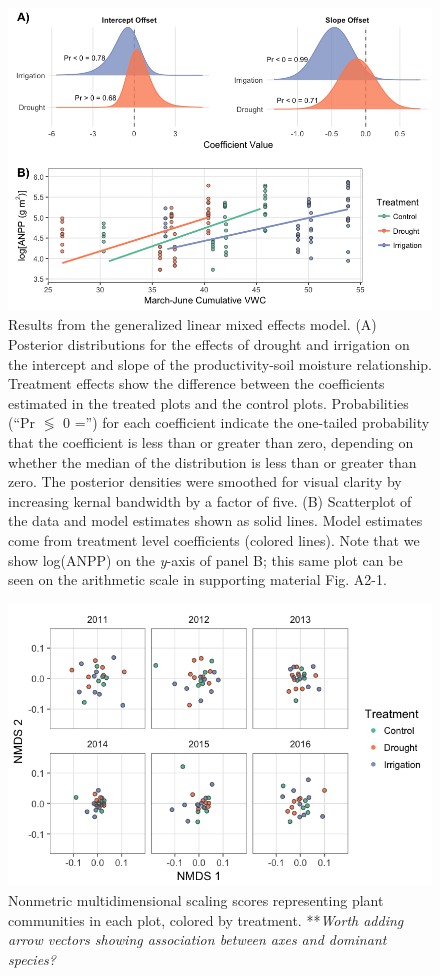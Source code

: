 \documentclass[fleqn,10pt,lineno]{wlpeerj} %
\begin{document}
\begin{figure}[!ht]
  \centering
      \includegraphics[width=5in]{../figures/glmm_main_results.png}
  \caption{Results from the generalized linear mixed effects model. (A) Posterior distributions for the effects of drought and irrigation on the intercept and slope of the productivity-soil moisture relationship. Treatment effects show the difference between the coefficients estimated in the treated plots and the control plots. Probabilities (``Pr $\lessgtr$ 0 ='') for each coefficient indicate the one-tailed probability that the coefficient is less than or greater than zero, depending on whether the median of the distribution is less than or greater than zero. The posterior densities were smoothed for visual clarity by increasing kernal bandwidth by a factor of five. (B) Scatterplot of the data and model estimates shown as solid lines. Model estimates come from treatment level coefficients (colored lines). Note that we show log(ANPP) on the \emph{y}-axis of panel B; this same plot can be seen on the arithmetic scale in supporting material Fig. A2-1.}
\end{figure}

\newpage{}

\begin{figure}[!ht]
  \centering
      \includegraphics[width=5in]{../figures/sppcomp_bray_all.png}
  \caption{Nonmetric multidimensional scaling scores representing plant communities in each plot, colored by treatment. **\emph{Worth adding arrow vectors showing association between axes and dominant species?}}
\end{figure}

\newpage{}



\end{document}
